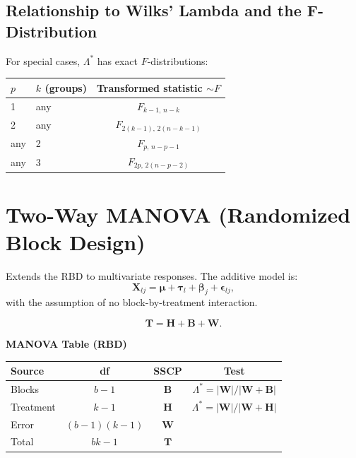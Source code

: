 \documentclass[12pt, a4paper]{article}
\newcommand{\muv}{\boldsymbol{\mu}}
\newcommand{\tauv}{\boldsymbol{\tau}}
\newcommand{\betav}{\boldsymbol{\beta}}
\newcommand{\epsilonv}{\boldsymbol{\epsilon}}
\begin{document}
\subsection{Relationship to Wilks' Lambda and the F-Distribution}

For special cases, $\Lambda^*$ has exact $F$-distributions:
\begin{center}
\begin{tabular}{llc}
\toprule
$p$ & $k$ (groups) & Transformed statistic $\sim F$ \\
\midrule
1       & any & $F_{k-1,\,n-k}$ \\
2       & any & $F_{2(k-1),\,2(n-k-1)}$ \\
any     & 2   & $F_{p,\,n-p-1}$ \\
any     & 3   & $F_{2p,\,2(n-p-2)}$ \\
\bottomrule
\end{tabular}
\end{center}

\section{Two-Way MANOVA (Randomized Block Design)}

Extends the RBD to multivariate responses. The additive model is:
\[
  \mathbf{X}_{lj} = \muv + \tauv_l + \betav_j + \epsilonv_{lj},
\]
with the assumption of no block-by-treatment interaction.

\[
  \mathbf{T} = \mathbf{H} + \mathbf{B} + \mathbf{W}.
\]

\begin{keybox}\noindent\textbf{MANOVA Table (RBD)}\par\smallskip
\begin{center}
\begin{tabular}{lccc}
\toprule
Source & df & SSCP & Test \\
\midrule
Blocks    & $b-1$       & $\mathbf{B}$ & $\Lambda^* = |\mathbf{W}|/|\mathbf{W}+\mathbf{B}|$ \\
Treatment & $k-1$       & $\mathbf{H}$ & $\Lambda^* = |\mathbf{W}|/|\mathbf{W}+\mathbf{H}|$ \\
Error     & $(b-1)(k-1)$& $\mathbf{W}$ & \\
Total     & $bk-1$      & $\mathbf{T}$ & \\
\bottomrule
\end{tabular}
\end{center}
\end{keybox}
\end{document}
